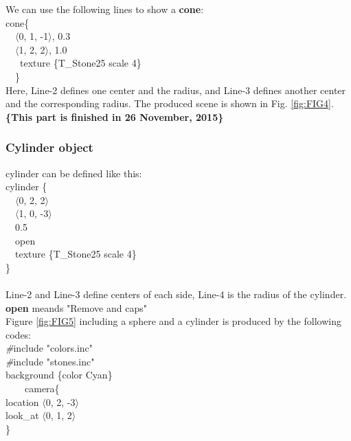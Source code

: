 \documentclass[fleqn,10pt]{wlscirep}
\begin{document}
We can use the following lines to show a \textbf{cone}:\\
\textcolor[rgb]{0.2,0.1,1}
{
cone\{ \\
\ \ $\langle$0, 1, -1$\rangle$, 0.3 \\
\ \ $\langle$1, 2, 2$\rangle$, 1.0  \\
\ \ \ texture \{T\_Stone25 scale 4\} \\
\ \ \}
}\\
Here, Line-2 defines one center and the radius, and Line-3 defines another center and the corresponding radius. The produced scene is shown in Fig. \ref{fig:FIG4}.
\newline
\textbf{\{This part is finished in  26 November, 2015\}}
\subsubsection{Cylinder object}
cylinder can be defined like this:\\
\textcolor[rgb]{0.2,0.1,1}
{
cylinder \{ \\
\ \ $\langle$0, 2, 2$\rangle$ \\
\ \ $\langle$1, 0, -3$\rangle$ \\
\ \ 0.5 \\
\ \ open \\
\ \ texture \{T\_Stone25 scale 4\} \\
\}\\
}\\
Line-2 and Line-3 define centers of each side, Line-4 is the radius of the cylinder. \textbf{open} meands "Remove and caps"\\

Figure \ref{fig:FIG5} including a sphere and a cylinder is produced by the following codes:\\
\noindent \textcolor[rgb]{0.2,0.1,1}{\emph{\#}include "colors.inc"}\\
\textcolor[rgb]{0.2,0.1,1}{\emph{\#}include "stones.inc"}\\
\textcolor[rgb]{0.2,0.1,1}{background \{color Cyan\}} \\
\textcolor[rgb]{0.2,0.1,1}{\ \ \ \ camera\{ } \\
\textcolor[rgb]{0.2,0.1,1}{ location $\langle$0, 2, -3$\rangle$ } \\
\textcolor[rgb]{0.2,0.1,1}{ look\_at $\langle$0, 1, 2$\rangle$  } \\
\textcolor[rgb]{0.2,0.1,1}{ \}  } \\
\end{document}
